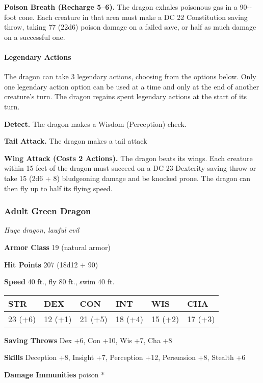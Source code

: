 \documentclass[
]{article}
\begin{document}
\textbf{Poison Breath (Recharge 5--6).} The dragon exhales poisonous gas
in a 90-­‐foot cone. Each creature in that area must make a DC 22
Constitution saving throw, taking 77 (22d6) poison damage on a failed
save, or half as much damage on a successful one.

\hypertarget{legendary-actions-4}{%
\paragraph{Legendary Actions}\label{legendary-actions-4}}

The dragon can take 3 legendary actions, choosing from the options
below. Only one legendary action option can be used at a time and only
at the end of another creature's turn. The dragon regains spent
legendary actions at the start of its turn.

\textbf{Detect.} The dragon makes a Wisdom (Perception) check.

\textbf{Tail Attack.} The dragon makes a tail attack

\textbf{Wing Attack (Costs 2 Actions).} The dragon beats its wings. Each
creature within 15 feet of the dragon must succeed on a DC 23 Dexterity
saving throw or take 15 (2d6 + 8) bludgeoning damage and be knocked
prone. The dragon can then fly up to half its flying speed.

\hypertarget{adult-green-dragon}{%
\subsubsection{Adult Green Dragon}\label{adult-green-dragon}}

\emph{Huge dragon, lawful evil}

\textbf{Armor Class} 19 (natural armor)

\textbf{Hit Points} 207 (18d12 + 90)

\textbf{Speed} 40 ft., fly 80 ft., swim 40 ft.

\begin{longtable}[]{@{}llllll@{}}
\toprule
STR & DEX & CON & INT & WIS & CHA\tabularnewline
\midrule
\endhead
23 (+6) & 12 (+1) & 21 (+5) & 18 (+4) & 15 (+2) & 17 (+3)\tabularnewline
\bottomrule
\end{longtable}

\textbf{Saving Throws} Dex +6, Con +10, Wis +7, Cha +8

\textbf{Skills} Deception +8, Insight +7, Perception +12, Persuasion +8,
Stealth +6

\textbf{Damage Immunities} poison *
\end{document}
